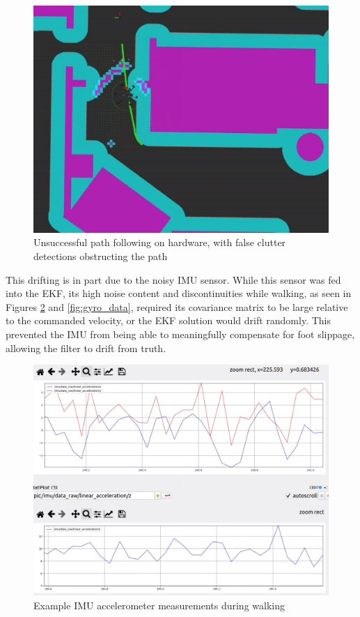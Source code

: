 \begin{figure}[H]
    \centerline{\includegraphics[scale=0.083]{./06_results/figures/unsuccessful_motion_planning.png}}
    \caption{Unsuccessful path following on hardware, with false clutter detections obstructing the path}
    \label{fig:hardware_path_following}
\end{figure}

This drifting is in part due to the noisy IMU sensor. While this sensor was fed into the EKF, its high noise content and discontinuities while walking, as seen in Figures \ref{fig:acc_data} and \ref{fig:gyro_data}, required its covariance matrix to be large relative to the commanded velocity, or the EKF solution would drift randomly. This prevented the IMU from being able to meaningfully compensate for foot slippage, allowing the filter to drift from truth. 

\begin{figure}[H]
    \centerline{\includegraphics[scale=0.1]{06_results/figures/accel_data.png}}
    \caption{Example IMU accelerometer measurements during walking}
    \label{fig:acc_data}
\end{figure}

